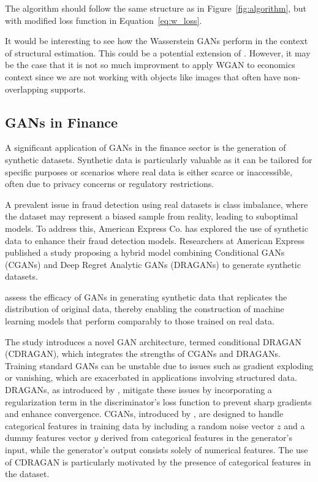 \documentclass[12pt]{article}
\begin{document}
The algorithm should follow the same structure as in
Figure~\ref{fig:algorithm}, but with modified loss function in
Equation~\eqref{eq:w_loss}.

It would be interesting to see how the Wasserstein GANs perform in the context
of structural estimation. This could be a potential extension of
\citet{kaji2023adversarial}. However, it may be the case that it is not so much
improvment to apply WGAN to economics context since we are not working with
objects like images that often have non-overlapping supports.

\subsection{GANs in Finance}

A significant application of GANs in the finance sector is the generation of synthetic datasets. Synthetic data is particularly valuable as it can be tailored for specific purposes or scenarios where real data is either scarce or inaccessible, often due to privacy concerns or regulatory restrictions.

A prevalent issue in fraud detection using real datasets is class imbalance, where the dataset may represent a biased sample from reality, leading to suboptimal models. To address this, American Express Co. has explored the use of synthetic data to enhance their fraud detection models. Researchers at American Express published a study \citep{efimovUsingGenerativeAdversarial2020} proposing a hybrid model combining Conditional GANs (CGANs) and Deep Regret Analytic GANs (DRAGANs) to generate synthetic datasets.

\cite{efimovUsingGenerativeAdversarial2020} assess the efficacy of GANs in generating synthetic data that replicates the distribution of original data, thereby enabling the construction of machine learning models that perform comparably to those trained on real data.

The study introduces a novel GAN architecture, termed conditional DRAGAN (CDRAGAN), which integrates the strengths of CGANs and DRAGANs. Training standard GANs can be unstable due to issues such as gradient exploding or vanishing, which are exacerbated in applications involving structured data. DRAGANs, as introduced by \cite{kodali2017convergence}, mitigate these issues by incorporating a regularization term in the discriminator's loss function to prevent sharp gradients and enhance convergence. CGANs, introduced by \cite{mirza2014conditional}, are designed to handle categorical features in training data by including a random noise vector \(z\) and a dummy features vector \(y\) derived from categorical features in the generator's input, while the generator's output consists solely of numerical features. The use of CDRAGAN is particularly motivated by the presence of categorical features in the dataset.
\end{document}
